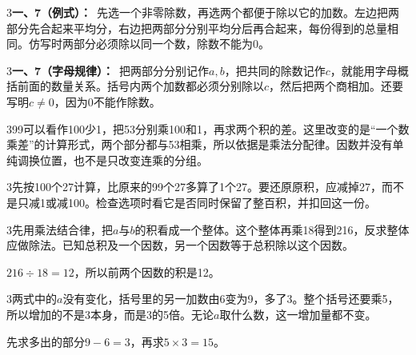 \documentclass[multi=snippet,border={5bp 20bp 5bp 5bp}]{standalone}
\newenvironment{snippet}[3]{\begin{minipage}{#1bp}\color{answerred}\fontsize{#2}{#3}\selectfont\raggedright}{\end{minipage}}
\begin{document}
\begin{snippet}{505}{11.5}{14}\begin{multicols}{3}\raggedcolumns \textbf{一、7（例式）：}\ 先选一个非零除数，再选两个都便于除以它的加数。左边把两部分先合起来平均分，右边把两部分分别平均分后再合起来，每份得到的总量相同。仿写时两部分必须除以同一个数，除数不能为0。\end{multicols}\end{snippet}
\begin{snippet}{505}{11.5}{14}\begin{multicols}{3}\raggedcolumns \textbf{一、7（字母规律）：}\ 把两部分分别记作\(a,\allowbreak b\)\allowbreak ，把共同的除数记作\(c\)\allowbreak ，就能用字母概括前面的数量关系。括号内两个加数都必须分别除以\(c\)\allowbreak ，然后把两个商相加。还要写明\(c\ne0\)\allowbreak ，因为0不能作除数。\end{multicols}\end{snippet}
\begin{snippet}{505}{11.5}{14}\begin{multicols}{3}\raggedcolumns 99可以看作100少1，把53分别乘100和1，再求两个积的差。这里改变的是“一个数乘差”的计算形式，两个部分都与53相乘，所以依据是乘法分配律。因数并没有单纯调换位置，也不是只改变连乘的分组。\end{multicols}\end{snippet}
\begin{snippet}{505}{11.5}{14}\begin{multicols}{3}\raggedcolumns 先按100个27计算，比原来的99个27多算了1个27。要还原原积，应减掉27，而不是只减1或减100。检查选项时看它是否同时保留了整百积，并扣回这一份。\end{multicols}\end{snippet}
\begin{snippet}{505}{11.5}{14}\begin{multicols}{3}\raggedcolumns 先用乘法结合律，把\(a\)\allowbreak 与\(b\)\allowbreak 的积看成一个整体。这个整体再乘18得到216，反求整体应做除法。已知总积及一个因数，另一个因数等于总积除以这个因数。\par \(216\div18=12\)\allowbreak ，所以前两个因数的积是12。\end{multicols}\end{snippet}
\begin{snippet}{505}{11.5}{14}\begin{multicols}{3}\raggedcolumns 两式中的\(a\)\allowbreak 没有变化，括号里的另一加数由6变为9，多了3。整个括号还要乘5，所以增加的不是3本身，而是3的5倍。无论\(a\)\allowbreak 取什么数，这一增加量都不变。\par 先求多出的部分\(9-6=3\)\allowbreak ，再求\(5\times3=15\)\allowbreak 。\end{multicols}\end{snippet}
\end{document}
